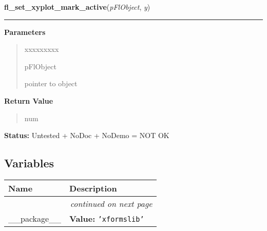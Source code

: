 \hspace{.8\funcindent}\begin{boxedminipage}{\funcwidth}

    \raggedright \textbf{fl\_set\_xyplot\_mark\_active}(\textit{pFlObject}, \textit{y})

    \vspace{-1.5ex}

    \rule{\textwidth}{0.5\fboxrule}
\setlength{\parskip}{2ex}
\setlength{\parskip}{1ex}
      \textbf{Parameters}
      \vspace{-1ex}

      \begin{quote}
        \begin{Ventry}{xxxxxxxxx}

          \item[pFlObject]

          pointer to object

        \end{Ventry}

      \end{quote}

      \textbf{Return Value}
    \vspace{-1ex}

      \begin{quote}
      num

      \end{quote}

\textbf{Status:} Untested + NoDoc + NoDemo = NOT OK



    \end{boxedminipage}



  \subsection{Variables}

    \vspace{-1cm}
\hspace{\varindent}\begin{longtable}{|p{\varnamewidth}|p{\vardescrwidth}|l}
\cline{1-2}
\cline{1-2} \centering \textbf{Name} & \centering \textbf{Description}& \\
\cline{1-2}
\endhead\cline{1-2}\multicolumn{3}{r}{\small\textit{continued on next page}}\\\endfoot\cline{1-2}
\endlastfoot\raggedright \_\-\_\-p\-a\-c\-k\-a\-g\-e\-\_\-\_\- & \raggedright \textbf{Value:} 
{\tt \texttt{'}\texttt{xformslib}\texttt{'}}&\\
\cline{1-2}
\end{longtable}

